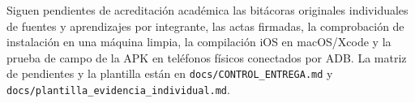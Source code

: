 Siguen pendientes de acreditación académica las bitácoras originales individuales de fuentes y aprendizajes por integrante, las actas firmadas, la comprobación de instalación en una máquina limpia, la compilación iOS en macOS/Xcode y la prueba de campo de la APK en teléfonos físicos conectados por ADB. La matriz de pendientes y la plantilla están en \texttt{docs/CONTROL\_ENTREGA.md} y \texttt{docs/plantilla\_evidencia\_individual.md}.

